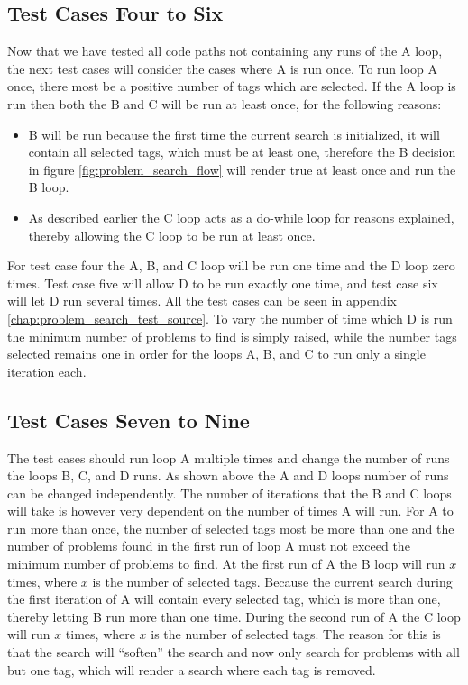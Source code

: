 \subsection{Test Cases Four to Six}
Now that we have tested all code paths not containing any runs of the A loop, the next test cases will consider the cases where A is run once.
To run loop A once, there most be a positive number of tags which are selected.
If the A loop is run then both the B and C will be run at least once, for the following reasons:
\begin{itemize}
	\item B will be run because the first time the current search is initialized, it will contain all selected tags, which must be at least one, therefore the B decision in figure \ref{fig:problem_search_flow} will render true at least once and run the B loop.
	\item As described earlier the C loop acts as a do-while loop for reasons explained, thereby allowing the C loop to be run at least once.
\end{itemize}

For test case four the A, B, and C loop will be run one time and the D loop zero times.
Test case five will allow D to be run exactly one time, and test case six will let D run several times.
All the test cases can be seen in appendix \ref{chap:problem_search_test_source}.
To vary the number of time which D is run the minimum number of problems to find is simply raised, while the number tags selected remains one in order for the loops A, B, and C to run only a single iteration each.

\subsection{Test Cases Seven to Nine}
The test cases should run loop A multiple times and change the number of runs the loops B, C, and D runs.
As shown above the A and D loops number of runs can be changed independently.
The number of iterations that the B and C loops will take is however very dependent on the number of times A will run.
For A to run more than once, the number of selected tags most be more than one and the number of problems found in the first run of loop A must not exceed the minimum number of problems to find.
At the first run of A the B loop will run $x$ times, where $x$ is the number of selected tags.
Because the current search during the first iteration of A will contain every selected tag, which is more than one, thereby letting B run more than one time.
During the second run of A the C loop will run $x$ times, where $x$ is the number of selected tags.
The reason for this is that the search will ``soften'' the search and now only search for problems with all but one tag, which will render a search where each tag is removed.

